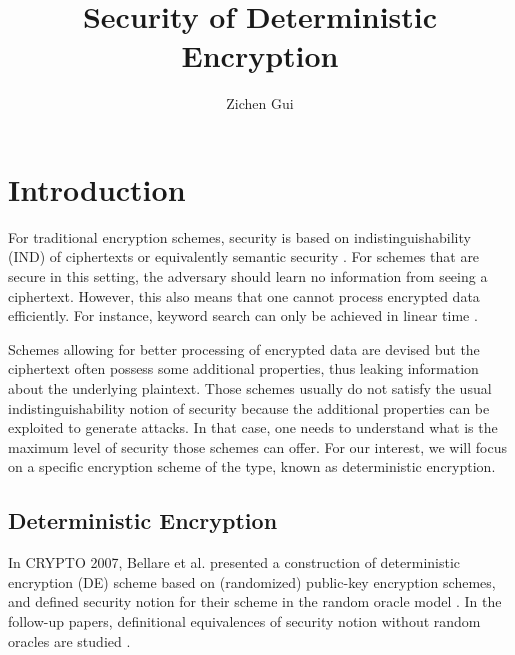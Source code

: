 \documentclass[10pt]{book}
\title{Security of Deterministic Encryption}
\author{Zichen Gui}
\begin{document}




\chapter{Introduction}
For traditional encryption schemes, security is based on indistinguishability (IND) of ciphertexts \cite{GOLDWASSER1984270} or equivalently semantic security \cite{Goldwasser:1982:PEA:800070.802212}. For schemes that are secure in this setting, the adversary should learn no information from seeing a ciphertext. However, this also means that one cannot process encrypted data efficiently. For instance, keyword search can only be achieved in linear time \cite{Boneh2004, Song:2000:PTS:882494.884426}.

Schemes allowing for better processing of encrypted data are devised but the ciphertext often possess some additional properties, thus leaking information about the underlying plaintext. Those schemes usually do not satisfy the usual indistinguishability notion of security because the additional properties can be exploited to generate attacks. In that case, one needs to understand what is the maximum level of security those schemes can offer. For our interest, we will focus on a specific encryption scheme of the type, known as deterministic encryption.




\section{Deterministic Encryption}
In CRYPTO 2007, Bellare et al. presented a construction of deterministic encryption (DE) scheme based on (randomized) public-key encryption schemes, and defined security notion for their scheme in the random oracle model \cite{Bellare2007}. In the follow-up papers, definitional equivalences of security notion without random oracles are studied \cite{Bellare2008, Boldyreva2008}.
\end{document}
